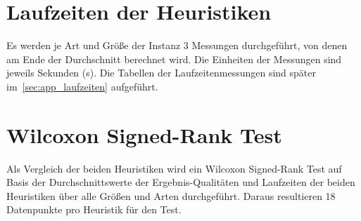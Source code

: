 \documentclass[a4paper, 10pt, twoside, onecolumn, parskip]{scrartcl}
\begin{document}
    \section{Laufzeiten der Heuristiken} \label{sec:laufzeiten}

    Es werden je Art und Größe der Instanz 3 Messungen durchgeführt, von denen am Ende der Durchschnitt berechnet wird.
    Die Einheiten der Messungen sind jeweils Sekunden (s).
    Die Tabellen der Laufzeitenmessungen sind später im~\autoref{sec:app_laufzeiten} aufgeführt.

    \section{Wilcoxon Signed-Rank Test}
    
    Als Vergleich der beiden Heuristiken wird ein Wilcoxon Signed-Rank Test auf Basis der Durchschnittswerte der Ergebnis-Qualitäten und Laufzeiten der beiden Heuristiken über alle Größen und Arten durchgeführt. Daraus resultieren 18 Datenpunkte pro Heuristik für den Test.
    
    
\end{document}
